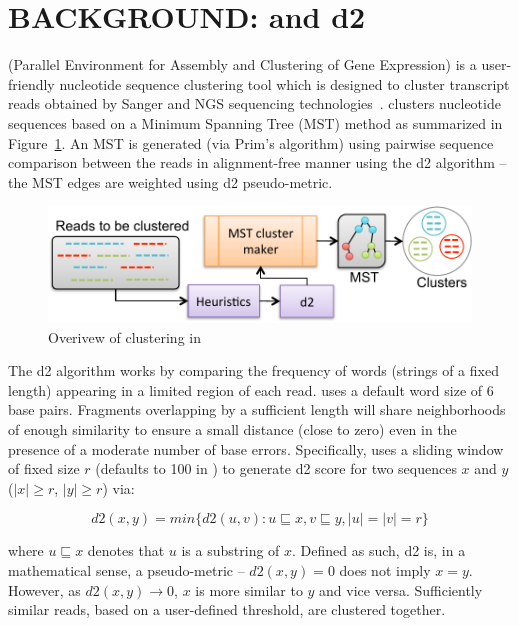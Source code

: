 \section{BACKGROUND: \peace\/ and d2}\label{sec:background}

\peace\/ (Parallel Environment for Assembly and Clustering of Gene
Expression) is a user-friendly nucleotide sequence clustering tool
which is designed to cluster transcript reads obtained by Sanger and
NGS sequencing technologies~\cite{rao-10,rao-18}. \peace\/ clusters
nucleotide sequences based on a Minimum Spanning Tree (MST) method as
summarized in Figure~\ref{fig:peace}.  An MST is generated (via Prim's
algorithm) using pairwise sequence comparison between the reads in
alignment-free manner using the d2 algorithm -- \ie\/ the MST edges
are weighted using d2 pseudo-metric.

\begin{figure}[h]
  \includegraphics[width=\linewidth]{figures/peace_overview.pdf}
  \caption{Overivew of clustering in \peace}\label{fig:peace}
\end{figure}

The d2 algorithm works by comparing the frequency of words (strings of
a fixed length) appearing in a limited region of each read. \peace\/
uses a default word size of 6 base pairs. Fragments overlapping by a
sufficient length will share neighborhoods of enough similarity to
ensure a small distance (close to zero) even in the presence of a
moderate number of base errors.  Specifically, \peace\/ uses a sliding
window of fixed size $r$ (defaults to 100 in \peace) to generate d2
score for two sequences $x$ and $y$ ($|x| \ge r$, $|y| \ge r$) via:

$$
d2(x, y) = min\big\{d2(u, v) : u \sqsubseteq x, v \sqsubseteq y, |u|= |v| = r\big\}
$$

\noindent where $u \sqsubseteq x$ denotes that $u$ is a substring of
$x$. Defined as such, d2 is, in a mathematical sense, a pseudo-metric
-- \ie\/ $d2(x, y) = 0$ does not imply $x = y$.  However, as $d2(x, y)
\rightarrow 0$, $x$ is more similar to $y$ and vice versa.
Sufficiently similar reads, based on a user-defined threshold, are
clustered together.

